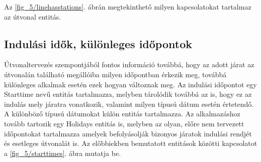 Az \ref{fig_5/linehasstations}. ábrán megtekinthető milyen kapcsolatokat tartalmaz az útvonal entitás. 


\subsection*{Indulási idők, különleges időpontok}
\label{starttimes}

Útvonaltervezés szempontjából fontos információ továbbá, hogy az adott járat az útvonalán található megállóiba milyen időpontban érkezik meg, továbbá különleges alkalmak esetén ezek hogyan változnak meg. 
Az indulási időpontot egy Starttime nevű entitás tartalmazza, melyben tárolódik továbbá az is, hogy ez az indulás mely járatra vonatkozik, valamint milyen típusú dátum esetén értetendő. 
A különböző típusú dátumokat külön entitás tartalmazza. 
Az alkalmazáshoz tovább tartozik egy Holidays entitás is, melyben az olyan, előre nem tervezett időpontokat tartalmazza amelyek befolyásolják bizonyos járatok indulási rendjét és esetleges útvonalát is. 
Az előbbiekben bemutatott entitások közötti kapcsolatot a \ref{fig_5/starttimes}. ábra mutatja be. 

